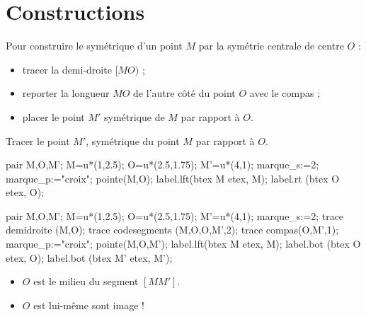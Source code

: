 \section{Constructions}
\begin{methode}
    Pour construire le symétrique d'un point $M$ par la symétrie centrale de centre $O$ :
    \begin{itemize}
       \item tracer la demi-droite $[MO)$ ;
       \item reporter la longueur $MO$ de l'autre côté du point $O$ avec le compas ;
       \item placer le point $M'$ symétrique de $M$ par rapport à $O$.
    \end{itemize}
    \exercice
    Tracer le point $M'$, symétrique du point $M$ par rapport à $O$. 
    
    \bigskip
    \begin{Geometrie}[CoinHD={(5u,3u)}]
        pair M,O,M';
        M=u*(1,2.5);
        O=u*(2.5,1.75);
        M'=u*(4,1);
        marque_s:=2;
        marque_p:="croix";        
        pointe(M,O);
        label.lft(btex M etex, M);
        label.rt (btex O etex, O);
    \end{Geometrie}
    \correction
    \begin{Geometrie}[CoinHD={(5u,5u)}]
        pair M,O,M';
        M=u*(1,2.5);
        O=u*(2.5,1.75);
        M'=u*(4,1);
        marque_s:=2;
        trace demidroite (M,O);
        trace codesegments (M,O,O,M',2);        
        trace compas(O,M',1);
        marque_p:="croix";        
        pointe(M,O,M');
        label.lft(btex M etex, M);
        label.bot (btex O etex, O);
        label.bot (btex M' etex, M');
    \end{Geometrie}
\end{methode}

\begin{remarques}
    \begin{itemize}
        \item $O$ est le milieu du segment $[MM']$.
        \item $O$ est lui-même sont image !
    \end{itemize}
\end{remarques}

